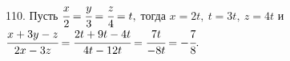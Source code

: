110. Пусть $\cfrac{x}{2}=\cfrac{y}{3}=\cfrac{z}{4}=t,$ тогда $x=2t,\ t=3t,\ z=4t$ и $\cfrac{x+3y-z}{2x-3z}=\cfrac{2t+9t-4t}{4t-12t}=\cfrac{7t}{-8t}=-\cfrac{7}{8}.$\\

